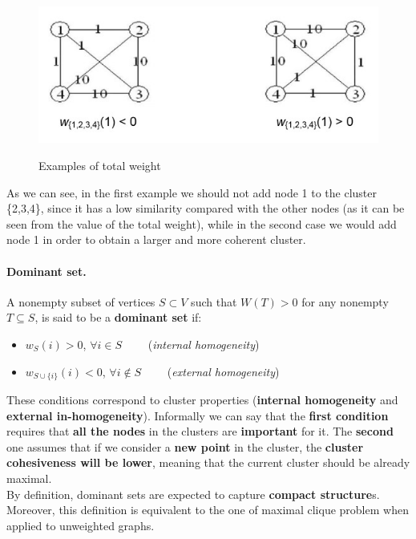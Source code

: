 \begin{figure}[h!]
		\centering
        \includegraphics[scale = 1.0]{img/total weight rxample.jpg}
		\label{mi}
        \caption{Examples of total weight}
\end{figure}

As we can see, in the first example we should not add node 1 to the cluster \{2,3,4\}, since it has a low similarity compared with the other nodes (as it can be seen from the value of the total weight), while in the second case we would add node 1 in order to obtain a larger and more coherent cluster.

\paragraph{Dominant set.} A nonempty subset of vertices $S\subset V$ such that $W(T)>0$ for any nonempty $T \subseteq S$, is said to be a \textbf{dominant set} if:
\begin{itemize}
  \item $w_S(i) > 0$, $\forall i \in S \qquad$ (\textit{internal homogeneity})
  \item $w_{S \cup \{i\}}(i) < 0$, $\forall i \notin S \qquad$ (\textit{external homogeneity})
\end{itemize}
These conditions correspond to cluster properties (\textbf{internal homogeneity} and \textbf{external in-homogeneity}). Informally we can say that the \textbf{first condition} requires that \textbf{all the nodes} in the clusters are \textbf{important} for it. The \textbf{second} one assumes that if we consider a \textbf{new point} in the cluster, the \textbf{cluster cohesiveness will be lower}, meaning that the current cluster should be already maximal.\\
By definition, dominant sets are expected to capture \textbf{compact structure}s. Moreover, this definition is equivalent to the one of maximal clique problem when applied to unweighted graphs.


